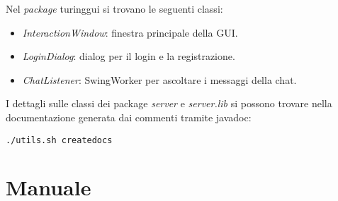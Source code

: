 \documentclass[a4paper]{article}
\theoremstyle{theorem}
\theoremstyle{remark}
\theoremstyle{definition}
\theoremstyle{corollary}
\theoremstyle{lemma}
\begin{document}
Nel \textit{package} turinggui si trovano le seguenti classi:
\begin{itemize}
	\item \textit{InteractionWindow}: finestra principale della GUI.
	\item \textit{LoginDialog}: dialog per il login e la registrazione.
	\item \textit{ChatListener}: SwingWorker per ascoltare i messaggi della chat.
\end{itemize}

I dettagli sulle classi dei package \textit{server} e \textit{server.lib} si possono trovare nella documentazione generata dai commenti tramite javadoc: 

\texttt{./utils.sh createdocs}

\section{Manuale}
\end{document}
